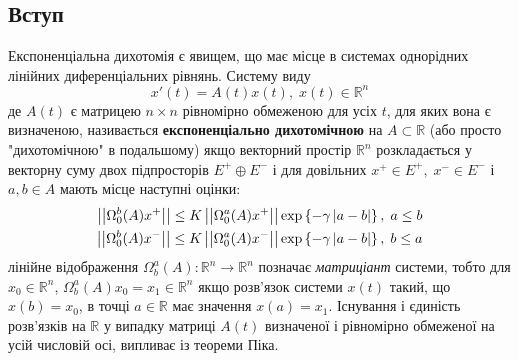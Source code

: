 \documentclass{SHVpaper}
\begin{document}
\subsection{Вступ}
Експоненціальна дихотомія є явищем, що має місце в системах однорідних лінійних диференціальних рівнянь. 
Систему виду 
\begin{equation}x'(t)=A(t)x(t),\;x(t)\in\mathbb{R}^n\end{equation}
де $A(t)$ є матрицею $n\times n$ рівномірно обмеженою для усіх $t$, для яких вона є визначеною,
називається \textbf{експоненціально дихотомічною} на $A\subset\mathbb{R}$
(або просто "дихотомічною" в подальшому) якщо векторний простір $\mathbb{R}^n$ розкладається
у векторну суму двох підпросторів $E^+\oplus E^-$ і для довільних $x^+\in E^+,\; x^-\in E^-$ і $a,b\in A$ мають місце наступні оцінки:
\begin{equation}\begin{aligned}\label{DichotomyDef}
	\left|\left|\Omega^b_0(A)x^+\right|\right|\leq K\left|\left|\Omega_0^a(A)x^+\right|\right|\exp\left\{-\gamma\left|a-b\right|\right\},\;a\leq b\\
	\left|\left|\Omega^b_0(A)x^-\right|\right|\leq K\left|\left|\Omega_0^a(A)x^-\right|\right|\exp\left\{-\gamma\left|a-b\right|\right\},\;b\leq a\\
\end{aligned}\end{equation}
лінійне відображення $\Omega^a_b(A):\mathbb{R}^n\to\mathbb{R}^n$ позначає \textit{матриціант} системи, тобто для$x_0\in\mathbb{R}^n$, 
$\Omega^a_b(A)x_0=x_1\in\mathbb{R}^n$ якщо розв’язок системи $x(t)$ такий, що $x(b)=x_0$, в точці $a\in\mathbb{R}$ має
значення $x(a)=x_1$. Існування і єдиність розв’язків на $\mathbb{R}$ у випадку матриці $A(t)$ визначеної і рівномірно обмеженої на
усій числовій осі, випливає із теореми Піка.
\end{document}
